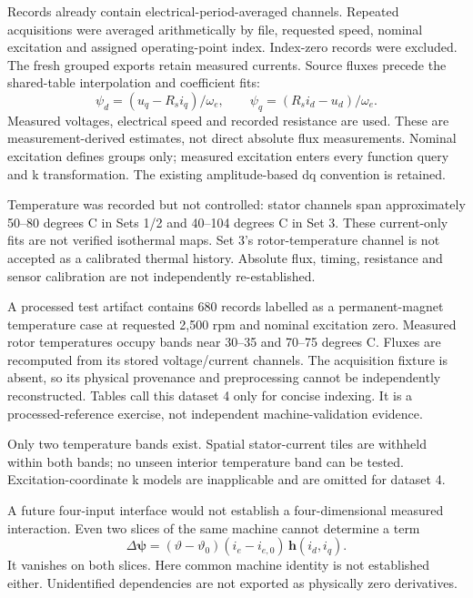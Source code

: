 \documentclass[11pt,a4paper]{article}
\begin{document}
Records already contain electrical-period-averaged channels. Repeated acquisitions were averaged arithmetically by file, requested speed, nominal excitation and assigned operating-point index. Index-zero records were excluded. The fresh grouped exports retain measured currents. Source fluxes precede the shared-table interpolation and coefficient fits:
\begin{equation}
 \psi_d=(u_q-R_s i_q)/\omega_e,\qquad
 \psi_q=(R_s i_d-u_d)/\omega_e.
\end{equation}
Measured voltages, electrical speed and recorded resistance are used. These are measurement-derived estimates, not direct absolute flux measurements. Nominal excitation defines groups only; measured excitation enters every function query and k transformation. The existing amplitude-based dq convention is retained.

Temperature was recorded but not controlled: stator channels span approximately 50--80 degrees C in Sets 1/2 and 40--104 degrees C in Set 3. These current-only fits are not verified isothermal maps. Set 3's rotor-temperature channel is not accepted as a calibrated thermal history. Absolute flux, timing, resistance and sensor calibration are not independently re-established.

A processed test artifact contains 680 records labelled as a permanent-magnet temperature case at requested 2,500 rpm and nominal excitation zero. Measured rotor temperatures occupy bands near 30--35 and 70--75 degrees C. Fluxes are recomputed from its stored voltage/current channels. The acquisition fixture is absent, so its physical provenance and preprocessing cannot be independently reconstructed. Tables call this dataset 4 only for concise indexing. It is a processed-reference exercise, not independent machine-validation evidence.

Only two temperature bands exist. Spatial stator-current tiles are withheld within both bands; no unseen interior temperature band can be tested. Excitation-coordinate k models are inapplicable and are omitted for dataset 4.

A future four-input interface would not establish a four-dimensional measured interaction. Even two slices of the same machine cannot determine a term
\begin{equation}
 \Delta\bm\psi=(\vartheta-\vartheta_0)(i_e-i_{e,0})\,\bm h(i_d,i_q).
\end{equation}
It vanishes on both slices. Here common machine identity is not established either. Unidentified dependencies are not exported as physically zero derivatives.
\end{document}
